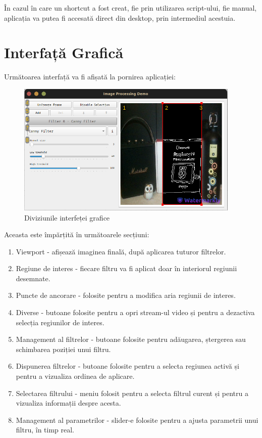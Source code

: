 În cazul în care un shortcut a fost creat, fie prin utilizarea script-ului, fie manual, aplicația va putea
fi accesată direct din desktop, prin intermediul acestuia.

\pagebreak
\section{Interfață Grafică}

Următoarea interfață va fi afișată la pornirea aplicației:
\begin{figure}[H]
	\includegraphics[width=0.95\textwidth, height=0.5\textwidth]{resources/Manual_Outline.jpg}
	\caption{Diviziunile interfeței grafice}
\end{figure}

Aceasta este împărțită în următoarele secțiuni:
\begin{enumerate}
	\item Viewport - afișează imaginea finală, după aplicarea tuturor filtrelor.
	\item Regiune de interes - fiecare filtru va fi aplicat doar în interiorul regiunii desemnate.
	\item Puncte de ancorare - folosite pentru a modifica aria regiunii de interes.
	\item Diverse - butoane folosite pentru a opri stream-ul video și pentru a dezactiva selecția regiunilor de interes.
	\item Management al filtrelor - butoane folosite pentru adăugarea, ștergerea sau schimbarea poziției unui filtru.
	\item Dispunerea filtrelor - butoane folosite pentru a selecta regiunea activă și pentru a vizualiza ordinea de aplicare.
	\item Selectarea filtrului - meniu folosit pentru a selecta filtrul curent și pentru a vizualiza informații despre acesta.
	\item Management al parametrilor - slider-e folosite pentru a ajusta parametrii unui filtru, în timp real.
\end{enumerate}

